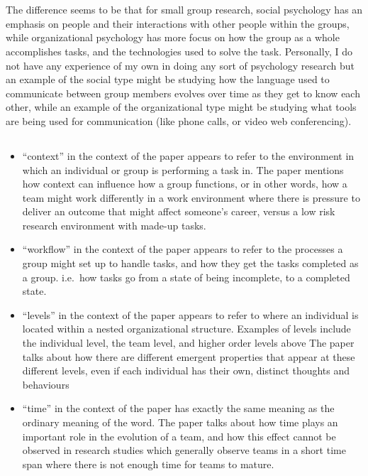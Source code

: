 \documentclass[letterpaper,12pt]{article}
\begin{document}
\section{}
\subsection{}
The difference seems to be that for small group research, social psychology has an emphasis on
people and their interactions with other people within the groups, while organizational psychology
has more focus on how the group as a whole accomplishes tasks, and the technologies used to solve the task.
Personally, I do not have any experience of my own in doing any sort of psychology research but an
example of the social type might be studying how the language used to communicate between group members
evolves over time as they get to know each other, while an example of the organizational type might be
studying what tools are being used for communication (like phone calls, or video web conferencing).

\subsection{}
\begin{itemize}
	\item ``context'' in the context of the paper appears to refer to the
	      environment in which an individual or group is  performing a task in. The paper
	      mentions how context can influence how a group functions, or in other words, how
	      a team might work differently in a work environment where there is pressure to
	      deliver an outcome that might affect someone's career, versus a low risk
	      research environment with made-up tasks.
	\item ``workflow'' in the context of the paper appears to refer to the
	      processes a group might set up to handle tasks, and how they get the tasks
	      completed as a group. i.e.\ how tasks go from a state of being incomplete, to a
	      completed state.
	\item ``levels'' in the context of the paper appears to refer to where an individual is located within a nested
	      organizational structure. Examples of levels include the individual level, the team level, and higher order levels above
	      The paper talks about how there are different emergent properties that appear at these different levels, even if
	      each individual has their own, distinct thoughts and behaviours
	\item ``time'' in the context of the paper has exactly the same meaning as the ordinary meaning of the word. The paper
	      talks about how time plays an important role in the evolution of a team, and how this effect cannot be observed in
	      research studies which generally observe teams in a short time span where there is not enough time for teams to mature.
\end{itemize}
\end{document}
